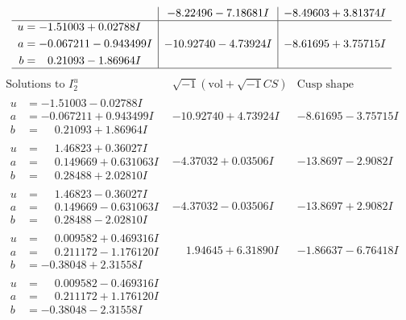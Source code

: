 \documentclass[1p]{elsarticle_modified}
\theoremstyle{definition}
\newcommand{\I}{\sqrt{-1}}
\begin{document}
$$\begin{array}{c|c|c}
 & -8.22496 - 7.18681 I & -8.49603 + 3.81374 I \\ \hline\begin{aligned}
u &= -1.51003 + 0.02788 I \\
a &= -0.067211 - 0.943499 I \\
b &= \phantom{-}0.21093 - 1.86964 I\end{aligned}
 & -10.92740 - 4.73924 I & -8.61695 + 3.75715 I\\
 \hline 
 \end{array}$$\newpage$$\begin{array}{c|c|c}  
\text{Solutions to }I^u_{2}& \I (\text{vol} + \sqrt{-1}CS) & \text{Cusp shape}\\
 \hline 
\begin{aligned}
u &= -1.51003 - 0.02788 I \\
a &= -0.067211 + 0.943499 I \\
b &= \phantom{-}0.21093 + 1.86964 I\end{aligned}
 & -10.92740 + 4.73924 I & -8.61695 - 3.75715 I \\ \hline\begin{aligned}
u &= \phantom{-}1.46823 + 0.36027 I \\
a &= \phantom{-}0.149669 + 0.631063 I \\
b &= \phantom{-}0.28488 + 2.02810 I\end{aligned}
 & -4.37032 + 0.03506 I & -13.8697 - 2.9082 I \\ \hline\begin{aligned}
u &= \phantom{-}1.46823 - 0.36027 I \\
a &= \phantom{-}0.149669 - 0.631063 I \\
b &= \phantom{-}0.28488 - 2.02810 I\end{aligned}
 & -4.37032 - 0.03506 I & -13.8697 + 2.9082 I \\ \hline\begin{aligned}
u &= \phantom{-}0.009582 + 0.469316 I \\
a &= \phantom{-}0.211172 - 1.176120 I \\
b &= -0.38048 + 2.31558 I\end{aligned}
 & \phantom{-}1.94645 + 6.31890 I & -1.86637 - 6.76418 I \\ \hline\begin{aligned}
u &= \phantom{-}0.009582 - 0.469316 I \\
a &= \phantom{-}0.211172 + 1.176120 I \\
b &= -0.38048 - 2.31558 I\end{aligned}

\end{array}$$
\end{document}
